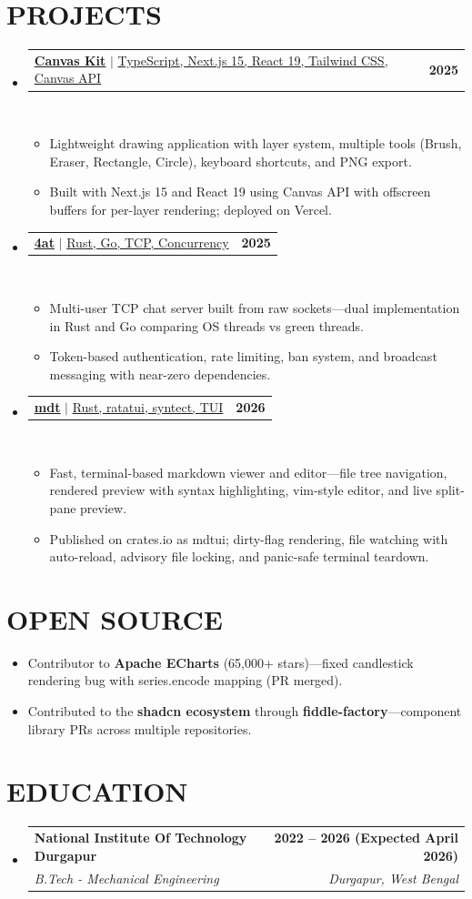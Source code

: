 \documentclass[letterpaper, 10pt]{article}
\makeatletter
\newcommand{\resumeItem}[1]{ \item\small{ {#1 \vspace{-3pt}} } }
\newcommand{\resumeSubheading}[4]{
\vspace{-2pt}
\item
\begin{tabular*}{1.0\textwidth}[t]{l@{\extracolsep{\fill}}r}
  \textbf{#1} & \textbf{\small #2} \\
  \textit{\small#3} & \textit{\small #4} \\
\end{tabular*}
\vspace{-5pt}
}
\newcommand{\resumeProjectHeading}[2]{ \item
\begin{tabular*}{1.001\textwidth}{l@{\extracolsep{\fill}}r}
  \small#1 & \textbf{\small #2} \\
\end{tabular*}
\vspace{-7pt}
}
\newcommand{\resumeSubHeadingListStart}{\begin{itemize}[leftmargin=0.0in, label={}]}
\newcommand{\resumeSubHeadingListEnd}{\end{itemize}}
\newcommand{\resumeItemListStart}{\begin{itemize}
\vspace{-3pt}}
\newcommand{\resumeItemListEnd}{\end{itemize}
\vspace{-5pt}}
\makeatother
\begin{document}
  \section{PROJECTS}
  \vspace{-5pt}
  \resumeSubHeadingListStart \resumeProjectHeading
  {\href{https://canvas-kit.vercel.app}{\textbf{\underline{Canvas Kit}}} \href{https://github.com/PPRAMANIK62/canvas-kit}{} $|$ \underline{TypeScript, Next.js 15, React 19, Tailwind CSS, Canvas API}}{2025}\\
  \resumeItemListStart \resumeItem{\normalsize{Lightweight drawing application with layer system, multiple tools (Brush, Eraser, Rectangle, Circle), keyboard shortcuts, and PNG export.}}
  \resumeItem{\normalsize{Built with Next.js 15 and React 19 using Canvas API with offscreen buffers for per-layer rendering; deployed on Vercel.}}
  \resumeItemListEnd
  \vspace{-13pt}
  \resumeProjectHeading
  {\href{https://github.com/PPRAMANIK62/4at}{\textbf{\underline{4at}}} $|$ \underline{Rust, Go, TCP, Concurrency}}{2025}\\
  \resumeItemListStart \resumeItem{\normalsize{Multi-user TCP chat server built from raw sockets---dual implementation in Rust and Go comparing OS threads vs green threads.}}
  \resumeItem{\normalsize{Token-based authentication, rate limiting, ban system, and broadcast messaging with near-zero dependencies.}}
  \resumeItemListEnd
  \vspace{-13pt}
  \resumeProjectHeading
  {\href{https://github.com/PPRAMANIK62/mdt}{\textbf{\underline{mdt}}} $|$ \underline{Rust, ratatui, syntect, TUI}}{2026}\\
  \resumeItemListStart \resumeItem{\normalsize{Fast, terminal-based markdown viewer and editor---file tree navigation, rendered preview with syntax highlighting, vim-style editor, and live split-pane preview.}}
  \resumeItem{\normalsize{Published on crates.io as mdtui; dirty-flag rendering, file watching with auto-reload, advisory file locking, and panic-safe terminal teardown.}}
  \resumeItemListEnd \resumeSubHeadingListEnd
  \vspace{-14pt}

  \section{OPEN SOURCE}
  \resumeSubHeadingListStart \resumeItemListStart \resumeItem{\normalsize{Contributor to \textbf{Apache ECharts} (65,000+ stars)---fixed candlestick rendering bug with series.encode mapping (PR merged).}}
  \resumeItem{\normalsize{Contributed to the \textbf{shadcn ecosystem} through \textbf{fiddle-factory}---component library PRs across multiple repositories.}}
  \resumeItemListEnd \resumeSubHeadingListEnd
  \vspace{-14pt}

  \section{EDUCATION}
  \resumeSubHeadingListStart \resumeSubheading
  {National Institute Of Technology Durgapur}{2022 -- 2026 (Expected April 2026)}
  {B.Tech - Mechanical Engineering}{Durgapur, West Bengal}
  \resumeSubHeadingListEnd
\end{document}
